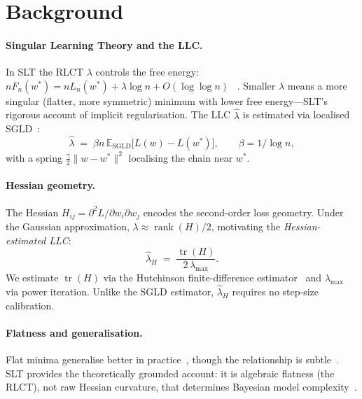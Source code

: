 \documentclass[12pt]{article}
\begin{document}
\section{Background}
\label{sec:background}

\paragraph{Singular Learning Theory and the LLC.}
In SLT the RLCT $\lambda$ controls the free energy:
$nF_n(w^*) = nL_n(w^*) + \lambda\log n + O(\log\log n)$
~\citep{watanabe2013widely}.  Smaller $\lambda$ means a more singular
(flatter, more symmetric) minimum with lower free energy—SLT's rigorous
account of implicit regularisation.  The LLC $\hat\lambda$ is estimated via
localised SGLD~\citep{lau2023quantifying}:
\begin{equation}
  \hat\lambda \;=\; \beta n\,\mathbb{E}_{\mathrm{SGLD}}\!\bigl[L(w) -
  L(w^*)\bigr], \qquad \beta = 1/\!\log n,
  \label{eq:llc}
\end{equation}
with a spring $\frac{\gamma}{2}\|w-w^*\|^2$ localising the chain near $w^*$.

\paragraph{Hessian geometry.}
The Hessian $H_{ij} = \partial^2 L / \partial w_i \partial w_j$ encodes the
second-order loss geometry.  Under the Gaussian approximation,
$\lambda \approx \operatorname{rank}(H)/2$, motivating the
\emph{Hessian-estimated LLC}:
\begin{equation}
  \hat\lambda_H \;=\; \frac{\operatorname{tr}(H)}{2\,\lambda_{\max}}.
  \label{eq:h-llc}
\end{equation}
We estimate $\operatorname{tr}(H)$ via the Hutchinson finite-difference
estimator~\citep{hutchinson1990stochastic} and $\lambda_{\max}$ via power
iteration.  Unlike the SGLD estimator, $\hat\lambda_H$ requires no
step-size calibration.

\paragraph{Flatness and generalisation.}
Flat minima generalise better in practice~\citep{keskar2017large}, though the
relationship is subtle~\citep{dinh2017sharp}.  SLT provides the
theoretically grounded account: it is algebraic flatness (the RLCT), not
raw Hessian curvature, that determines Bayesian model
complexity~\citep{watanabe2009algebraic}.
\end{document}
